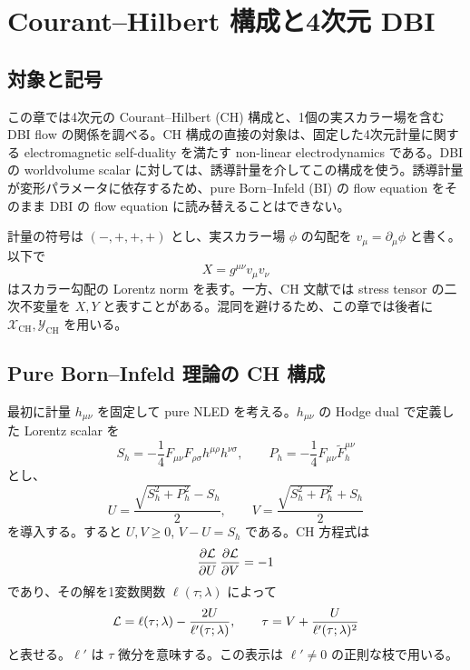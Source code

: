 \chapter{Courant--Hilbert 構成と4次元 DBI}
\label{chap:ch-dbi}

\section{対象と記号}

この章では4次元の Courant--Hilbert (CH) 構成\cite{Pezhman2026}と、1個の実スカラー場を含む DBI flow の関係を調べる。CH 構成の直接の対象は、固定した4次元計量に関する electromagnetic self-duality を満たす non-linear electrodynamics である。DBI の worldvolume scalar に対しては、誘導計量を介してこの構成を使う。誘導計量が変形パラメータに依存するため、pure Born--Infeld (BI) の flow equation をそのまま DBI の flow equation に読み替えることはできない。

計量の符号は $(-,+,+,+)$ とし、実スカラー場 $\phi$ の勾配を $v_\mu=\partial_\mu\phi$ と書く。以下で
\begin{equation}
 X=g^{\mu\nu}v_\mu v_\nu
 \label{eq:ch-scalar-X}
\end{equation}
はスカラー勾配の Lorentz norm を表す。一方、CH 文献では stress tensor の二次不変量を $X,Y$ と表すことがある。混同を避けるため、この章では後者に $\mathcal X_{\mathrm{CH}},\mathcal Y_{\mathrm{CH}}$ を用いる。

\section{Pure Born--Infeld 理論の CH 構成}

最初に計量 $h_{\mu\nu}$ を固定して pure NLED を考える。$h_{\mu\nu}$ の Hodge dual で定義した Lorentz scalar を
\begin{equation}
 S_h=-\frac14 F_{\mu\nu}F_{\rho\sigma}h^{\mu\rho}h^{\nu\sigma},
 \qquad P_h=-\frac14F_{\mu\nu}\widetilde F_h^{\mu\nu}
 \label{eq:ch-SP}
\end{equation}
とし、
\begin{equation}
 U=\frac{\sqrt{S_h^2+P_h^2}-S_h}{2},\qquad
 V=\frac{\sqrt{S_h^2+P_h^2}+S_h}{2}
 \label{eq:ch-UV}
\end{equation}
を導入する。すると $U,V\geq0$, $V-U=S_h$ である。CH 方程式は
\begin{equation}
 \frac{\partial\mathcal L}{\partial U}\,
 \frac{\partial\mathcal L}{\partial V}=-1
 \label{eq:ch-pde}
\end{equation}
であり、その解を1変数関数 $\ell(\tau;\lambda)$ によって
\begin{equation}
 \mathcal L=\ell(\tau;\lambda)-\frac{2U}{\ell'(\tau;\lambda)},
 \qquad
 \tau=V+\frac{U}{\ell'(\tau;\lambda)^2}
 \label{eq:ch-implicit}
\end{equation}
と表せる。$\ell'$ は $\tau$ 微分を意味する。この表示は $\ell'\neq0$ の正則な枝で用いる。

